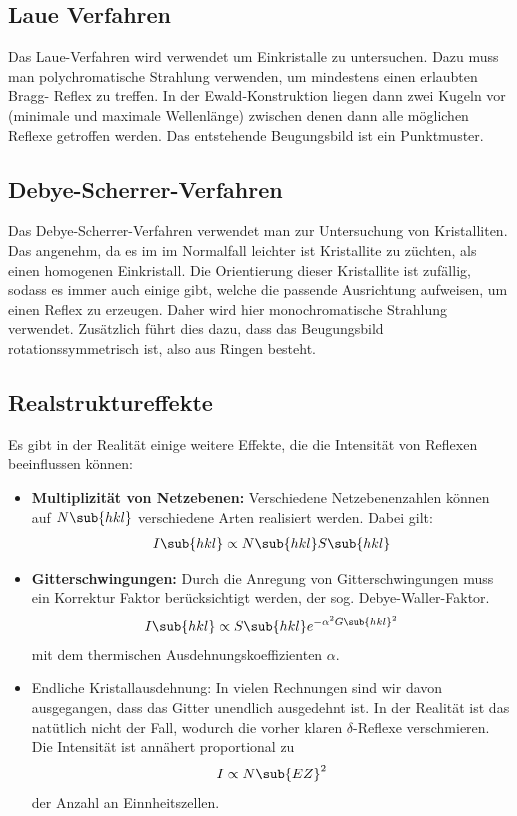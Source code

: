 \documentclass[bfvec]{summery_5.0}
\begin{document}
\subsection{Laue Verfahren}
Das Laue-Verfahren wird verwendet um Einkristalle zu untersuchen. Dazu muss
man polychromatische Strahlung verwenden, um mindestens einen erlaubten Bragg-
Reﬂex zu treﬀen. In der Ewald-Konstruktion liegen dann zwei Kugeln vor (minimale
und maximale Wellenlänge) zwischen denen dann alle möglichen Reﬂexe getroﬀen
werden. Das entstehende Beugungsbild ist ein Punktmuster.

\subsection{Debye-Scherrer-Verfahren}
Das Debye-Scherrer-Verfahren verwendet man zur Untersuchung von Kristalliten. Das angenehm, da es im im Normalfall leichter ist Kristallite zu züchten, als einen homogenen Einkristall. Die Orientierung dieser Kristallite ist zufällig, sodass es immer auch einige gibt, welche die passende Ausrichtung aufweisen, um einen Reﬂex
zu erzeugen. Daher wird hier monochromatische Strahlung verwendet. Zusätzlich
führt dies dazu, dass das Beugungsbild rotationssymmetrisch ist, also aus Ringen
besteht.

\subsection{Realstruktureffekte}
Es gibt in der Realität einige weitere Effekte, die die Intensität von Reflexen beeinflussen können:
\begin{itemize}
    \item {\bf Multiplizität von Netzebenen:} Verschiedene Netzebenenzahlen können auf $N\sub{hkl}$ verschiedene Arten realisiert werden. Dabei gilt:
    \begin{align*}
        I\sub{hkl}\propto N\sub{hkl} S\sub{hkl}
    \end{align*}
    \item {\bf Gitterschwingungen:} Durch die Anregung von Gitterschwingungen muss ein Korrektur Faktor berücksichtigt werden, der sog. Debye-Waller-Faktor.
    \begin{align*}
        I\sub{hkl}\propto S\sub{hkl} e^{-\alpha^2 G\sub{hkl}^2}
    \end{align*}
    mit dem thermischen Ausdehnungskoeffizienten $\alpha$.
    \item {Endliche Kristallausdehnung:} In vielen Rechnungen sind wir davon ausgegangen, dass das Gitter unendlich ausgedehnt ist. In der Realität ist das natütlich nicht der Fall, wodurch die vorher klaren $\delta$-Reflexe verschmieren. Die Intensität ist annähert proportional zu 
    \begin{align*}
        I\propto N\sub{EZ}^2
    \end{align*}
    der Anzahl an Einnheitszellen.
\end{itemize}
\end{document}
